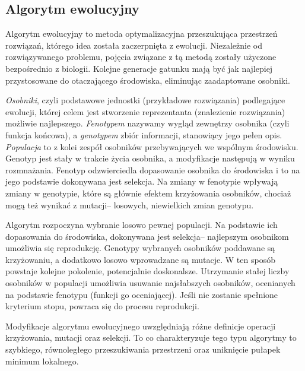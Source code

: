 \subsection{Algorytm ewolucyjny}
Algorytm ewolucyjny to metoda optymalizacyjna przeszukująca przestrzeń rozwiązań, którego idea została zaczerpnięta z ewolucji. Niezależnie od rozwiązywanego problemu, pojęcia związane z tą metodą zostały użyczone bezpośrednio z biologii. Kolejne generacje gatunku mają być jak najlepiej przystosowane do otaczającego środowiska, eliminując zaadaptowane osobniki. 

\textit{Osobniki}, czyli podstawowe jednostki (przykładowe rozwiązania) podlegające ewolucji, której celem jest stworzenie reprezentanta (znalezienie rozwiązania) możliwie najlepszego. \textit{Fenotypem} nazywamy wygląd zewnętrzy osobnika (czyli funkcja końcowa), a \textit{genotypem} zbiór informacji, stanowiący jego pełen opis. \textit{Populacja} to z kolei zespół osobników przebywających we wspólnym
środowisku. Genotyp jest stały w trakcie życia osobnika, a modyfikacje następują w wyniku rozmnażania. Fenotyp odzwierciedla dopasowanie osobnika do środowiska i to na jego podstawie dokonywana jest selekcja. Na zmiany w fenotypie wpływają zmiany w genotypie, które są głównie efektem krzyżowania osobników, chociaż mogą też wynikać z mutacji-- losowych, niewielkich zmian genotypu.

Algorytm rozpoczyna wybranie losowo pewnej populacji. Na podstawie ich dopasowania do środowiska, dokonywana jest selekcja-- najlepszym osobnikom umożliwia się reprodukcję. Genotypy wybranych osobników poddawane są krzyżowaniu, a dodatkowo losowo wprowadzane są mutacje. W ten sposób powstaje kolejne pokolenie, potencjalnie doskonalsze. Utrzymanie stałej liczby osobników w populacji umożliwia usuwanie najsłabszych osobników, ocenianych na podstawie fenotypu (funkcji go oceniającej). Jeśli nie zostanie spełnione kryterium stopu, powraca się do procesu reprodukcji.

Modyfikacje algorytmu ewolucyjnego uwzględniają różne definicje operacji krzyżowania, mutacji oraz selekcji. To co charakteryzuje tego typu algorytmy to szybkiego, równoległego przeszukiwania przestrzeni oraz uniknięcie pułapek minimum lokalnego.
